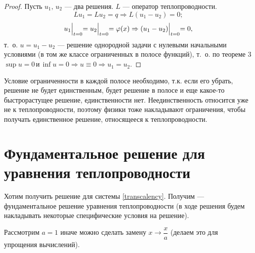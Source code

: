 \begin{proof}
Пусть $u_1, \, u_2 $ --- два решения. $L$ --- оператор теплопроводности.
$$Lu_1=Lu_2=q \Rightarrow L(u_1 - u_2) = 0;$$
$$u_1\Bigl|_{t=0} = u_2\Bigl|_{t=0}=\varphi(x) \Rightarrow (u_1-u_2)\Bigl|_{t=0}=0,$$
т.~о. $u = u_1 - u_2$ --- решение однородной задачи с нулевыми начальными условиями (в том же классе ограниченных в полосе функций), т.~о. по теореме 3 $\sup u = 0 \, \text{и} \, \inf u = 0 \Rightarrow u \equiv 0 \Rightarrow u_1 = u_2.$
\end{proof}

\begin{note}
Условие ограниченности в каждой полосе необходимо, т.к. если его убрать, решение не будет единственным, будет решение в полосе и еще какое-то быстрорастущее решение, единственности нет. Неединственность относится уже не к теплопроводности, поэтому физики тоже накладывают ограничения, чтобы получать единственное решение, относящееся к теплопроводности.
\end{note}

\section{Фундаментальное решение для уравнения теплопроводности}

Хотим получить решение для системы \eqref{transcalency}. Получим --- фундаментальное решение уравнения теплопроводности (в ходе решения будем накладывать некоторые специфические условия на решение).

Рассмотрим $a = 1$ иначе можно сделать замену $x \rightarrow \dfrac{x}{a}$ (делаем это для упрощения вычислений).

